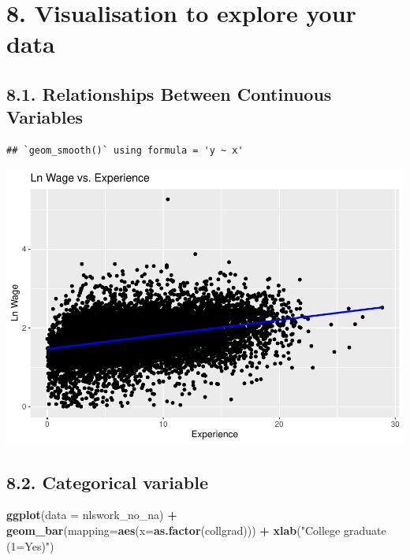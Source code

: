 \documentclass[
]{article}
\newenvironment{Shaded}{\begin{snugshade}}{\end{snugshade}}
\newcommand{\AttributeTok}[1]{\textcolor[rgb]{0.13,0.29,0.53}{#1}}
\newcommand{\FunctionTok}[1]{\textcolor[rgb]{0.13,0.29,0.53}{\textbf{#1}}}
\newcommand{\NormalTok}[1]{#1}
\newcommand{\SpecialCharTok}[1]{\textcolor[rgb]{0.81,0.36,0.00}{\textbf{#1}}}
\newcommand{\StringTok}[1]{\textcolor[rgb]{0.31,0.60,0.02}{#1}}
\begin{document}
\hypertarget{visualisation-to-explore-your-data}{%
\section{8. Visualisation to explore your
data}\label{visualisation-to-explore-your-data}}

\hypertarget{relationships-between-continuous-variables}{%
\subsection{8.1. Relationships Between Continuous
Variables}\label{relationships-between-continuous-variables}}

\begin{verbatim}
## `geom_smooth()` using formula = 'y ~ x'
\end{verbatim}

\includegraphics{RIntro_files/figure-latex/unnamed-chunk-19-1.pdf}

\hypertarget{categorical-variable}{%
\subsection{8.2. Categorical variable}\label{categorical-variable}}

\begin{Shaded}
\begin{Highlighting}[]
\FunctionTok{ggplot}\NormalTok{(}\AttributeTok{data =}\NormalTok{ nlswork\_no\_na) }\SpecialCharTok{+}
  \FunctionTok{geom\_bar}\NormalTok{(}\AttributeTok{mapping=}\FunctionTok{aes}\NormalTok{(}\AttributeTok{x=}\FunctionTok{as.factor}\NormalTok{(collgrad))) }\SpecialCharTok{+}
  \FunctionTok{xlab}\NormalTok{(}\StringTok{"College graduate (1=Yes)"}\NormalTok{)}
\end{Highlighting}
\end{Shaded}
\end{document}
